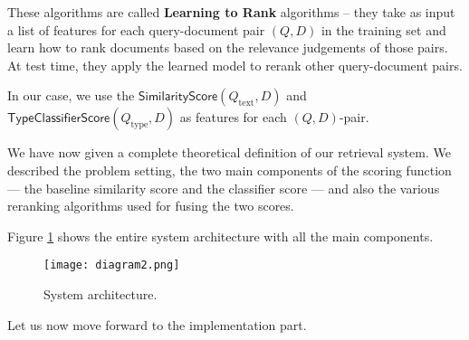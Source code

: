 These algorithms are called \textbf{Learning to Rank} algorithms --
they take as input a list of features for each query-document pair $(Q,D)$ in the training set
and learn how to rank documents based on the
relevance judgements of those pairs. At test time, they apply the learned model to rerank other query-document pairs.

In our case, we use the $\textsf{SimilarityScore}(Q_{\text{text}},D)$ and $\textsf{TypeClassifierScore}(Q_{\text{type}}, D)$ 
as features for each $(Q,D)$-pair.

We have now given a complete theoretical definition of our retrieval system. We described the problem setting,
the two main components of the scoring function --- the baseline similarity score and the classifier score ---
and also the various reranking algorithms used for fusing the two scores.

Figure \ref{diagram2} shows the entire system architecture with all the main components.

\begin{figure}
\centerline{
  \texttt{[image: diagram2.png]}
  }
  \caption{System architecture.}
  \label{diagram2}
\end{figure}

Let us now move forward to the implementation part.


